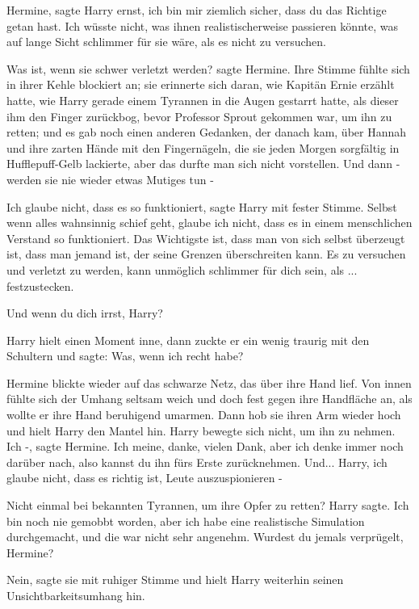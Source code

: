 \glqq Hermine\grqq{}, sagte Harry ernst, \glqq ich bin mir ziemlich sicher, dass
du das Richtige getan hast. Ich wüsste nicht, was ihnen realistischerweise
passieren könnte, was auf lange Sicht schlimmer für sie wäre, als es nicht zu
versuchen.\grqq{}

\glqq Was ist, wenn sie schwer verletzt werden?\grqq{} sagte Hermine. Ihre
Stimme fühlte sich in ihrer Kehle blockiert an; sie erinnerte sich daran, wie
Kapitän Ernie erzählt hatte, wie Harry gerade einem Tyrannen in die Augen
gestarrt hatte, als dieser ihm den Finger zurückbog, bevor Professor Sprout
gekommen war, um ihn zu retten; und es gab noch einen anderen Gedanken, der
danach kam, über Hannah und ihre zarten Hände mit den Fingernägeln, die sie
jeden Morgen sorgfältig in Hufflepuff-Gelb lackierte, aber das durfte man sich
nicht vorstellen. \glqq Und dann - werden sie nie wieder etwas Mutiges tun
-\grqq{}

\glqq Ich glaube nicht, dass es so funktioniert\grqq{}, sagte Harry mit fester
Stimme. \glqq Selbst wenn alles wahnsinnig schief geht, glaube ich nicht, dass
es in einem menschlichen Verstand so funktioniert. Das Wichtigste ist, dass man
von sich selbst überzeugt ist, dass man jemand ist, der seine Grenzen
überschreiten kann. Es zu versuchen und verletzt zu werden, kann unmöglich
schlimmer für dich sein, als ... festzustecken.\grqq{}

\glqq Und wenn du dich irrst, Harry?\grqq{}

Harry hielt einen Moment inne, dann zuckte er ein wenig traurig mit den
Schultern und sagte: \glqq Was, wenn ich recht habe?\grqq{}

Hermine blickte wieder auf das schwarze Netz, das über ihre Hand lief. Von innen
fühlte sich der Umhang seltsam weich und doch fest gegen ihre Handfläche an, als
wollte er ihre Hand beruhigend umarmen. Dann hob sie ihren Arm wieder hoch und
hielt Harry den Mantel hin. Harry bewegte sich nicht, um ihn zu nehmen. \glqq
Ich -\grqq{}, sagte Hermine. \glqq Ich meine, danke, vielen Dank, aber ich denke
immer noch darüber nach, also kannst du ihn fürs Erste zurücknehmen. Und...
Harry, ich glaube nicht, dass es richtig ist, Leute auszuspionieren -\grqq{}

\glqq Nicht einmal bei bekannten Tyrannen, um ihre Opfer zu retten?\grqq{} Harry
sagte. \glqq Ich bin noch nie gemobbt worden, aber ich habe eine realistische
Simulation durchgemacht, und die war nicht sehr angenehm. Wurdest du jemals
verprügelt, Hermine?\grqq{}

\glqq Nein\grqq{}, sagte sie mit ruhiger Stimme und hielt Harry weiterhin seinen
Unsichtbarkeitsumhang hin.

